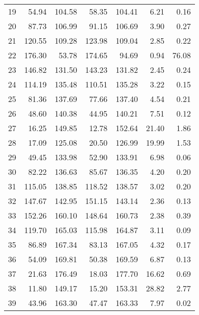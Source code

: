 \begin{tabular}{lrrrrrr}
19 &    54.94 &   104.58 &      58.35 &     104.41 &          6.21 &          0.16 \\
20 &    87.73 &   106.99 &      91.15 &     106.69 &          3.90 &          0.27 \\
21 &   120.55 &   109.28 &     123.98 &     109.04 &          2.85 &          0.22 \\
22 &   176.30 &    53.78 &     174.65 &      94.69 &          0.94 &         76.08 \\
23 &   146.82 &   131.50 &     143.23 &     131.82 &          2.45 &          0.24 \\
24 &   114.19 &   135.48 &     110.51 &     135.28 &          3.22 &          0.15 \\
25 &    81.36 &   137.69 &      77.66 &     137.40 &          4.54 &          0.21 \\
26 &    48.60 &   140.38 &      44.95 &     140.21 &          7.51 &          0.12 \\
27 &    16.25 &   149.85 &      12.78 &     152.64 &         21.40 &          1.86 \\
28 &    17.09 &   125.08 &      20.50 &     126.99 &         19.99 &          1.53 \\
29 &    49.45 &   133.98 &      52.90 &     133.91 &          6.98 &          0.06 \\
30 &    82.22 &   136.63 &      85.67 &     136.35 &          4.20 &          0.20 \\
31 &   115.05 &   138.85 &     118.52 &     138.57 &          3.02 &          0.20 \\
32 &   147.67 &   142.95 &     151.15 &     143.14 &          2.36 &          0.13 \\
33 &   152.26 &   160.10 &     148.64 &     160.73 &          2.38 &          0.39 \\
34 &   119.70 &   165.03 &     115.98 &     164.87 &          3.11 &          0.09 \\
35 &    86.89 &   167.34 &      83.13 &     167.05 &          4.32 &          0.17 \\
36 &    54.09 &   169.81 &      50.38 &     169.59 &          6.87 &          0.13 \\
37 &    21.63 &   176.49 &      18.03 &     177.70 &         16.62 &          0.69 \\
38 &    11.80 &   149.17 &      15.20 &     153.31 &         28.82 &          2.77 \\
39 &    43.96 &   163.30 &      47.47 &     163.33 &          7.97 &          0.02 \\

\end{tabular}
